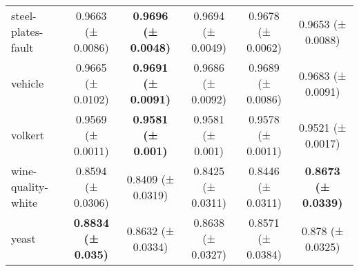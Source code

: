 \documentclass[11pt]{article}
\begin{document}
\begin{table}[]
{\begin{tabular}{@{}lccccc@{}}
steel-plates-fault & 0.9663 (± 0.0086)          & \textbf{0.9696 (± 0.0048)} & 0.9694 (± 0.0049)          & 0.9678 (± 0.0062) & 0.9653 (± 0.0088)          \\
vehicle            & 0.9665 (± 0.0102)          & \textbf{0.9691 (± 0.0091)} & 0.9686 (± 0.0092)          & 0.9689 (± 0.0086) & 0.9683 (± 0.0091)          \\
volkert            & 0.9569 (± 0.0011)          & \textbf{0.9581 (± 0.001)}  & 0.9581 (± 0.001)           & 0.9578 (± 0.0011) & 0.9521 (± 0.0017)          \\
wine-quality-white & 0.8594 (± 0.0306)          & 0.8409 (± 0.0319)          & 0.8425 (± 0.0311)          & 0.8446 (± 0.0311) & \textbf{0.8673 (± 0.0339)} \\
yeast              & \textbf{0.8834 (± 0.035)}  & 0.8632 (± 0.0334)          & 0.8638 (± 0.0327)          & 0.8571 (± 0.0384) & 0.878 (± 0.0325)           \\ \bottomrule
\end{tabular}%
}
\end{table}
\end{document}
